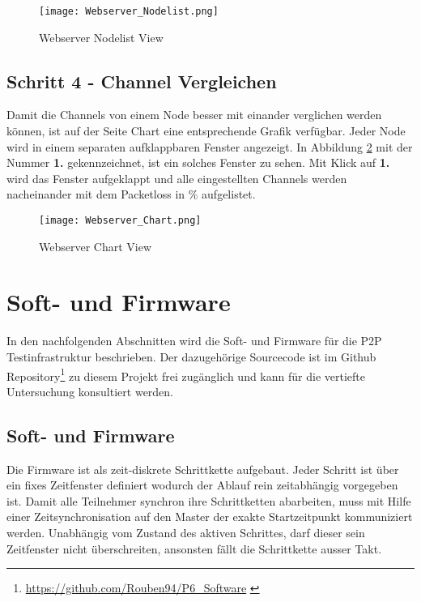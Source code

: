 \begin{figure} [H]
	\centering
	\texttt{[image: Webserver\_Nodelist.png]}
	\caption{Webserver Nodelist View}
	\label{fig:WebserverNodelistView}
\end{figure}

\subsection{Schritt 4 - Channel Vergleichen}\label{sec:SchrittChannelVergleichen}
Damit die Channels von einem Node besser mit einander verglichen werden können, ist auf der Seite Chart eine entsprechende Grafik verfügbar. Jeder Node wird in einem separaten aufklappbaren Fenster angezeigt. In Abbildung \ref{fig:WebserverChartView} mit der Nummer \textbf{1.} gekennzeichnet, ist ein solches Fenster zu sehen. Mit Klick auf \textbf{1.} wird das Fenster aufgeklappt und alle eingestellten Channels werden nacheinander mit dem Packetloss in \% aufgelistet.
\begin{figure} [H]
	\centering
	\texttt{[image: Webserver\_Chart.png]}
	\caption{Webserver Chart View}
	\label{fig:WebserverChartView}
\end{figure}

\newpage
\section{Soft- und Firmware}\label{sec:P2PSoft-undFirmware}
In den nachfolgenden Abschnitten wird die Soft- und Firmware für die P2P Testinfrastruktur beschrieben.
Der dazugehörige Sourcecode ist im Github Repository\footnote{\url{https://github.com/Rouben94/P6_Software} \cite{anklin_bobst_horath_rouben94p6_software_nodate}} zu diesem Projekt frei zugänglich und kann für die vertiefte Untersuchung konsultiert werden.

\subsection{Soft- und Firmware}\label{sec:SoftundFirmware}
Die Firmware ist als zeit-diskrete Schrittkette aufgebaut.
Jeder Schritt ist über ein fixes Zeitfenster definiert wodurch der Ablauf rein zeitabhängig vorgegeben ist.
Damit alle Teilnehmer synchron ihre Schrittketten abarbeiten, muss mit Hilfe einer Zeitsynchronisation auf den Master der exakte Startzeitpunkt kommuniziert werden.
Unabhängig vom Zustand des aktiven Schrittes, darf dieser sein Zeitfenster nicht überschreiten, ansonsten fällt die Schrittkette ausser Takt. 

